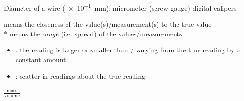 
\begin{question}%

  Diameter of a wire (\SI{e-1}{mm}): micrometer (screw gauge) \OR digital calipers~\hfill{}
\end{question}

\begin{question}%

   means the closeness of the value(s)/measurement(s) to the true value~\hfill{}\\*
   means the \textit{range} (i.e. spread) of the values/measurements~\hfill{}
\end{question}

\begin{question}%

  \begin{itemize}
    \item {}: the reading is larger or smaller than / varying from the true reading by a constant amount.~\hfill{}
    \item {}: scatter in readings about the true reading~\hfill{}
  \end{itemize}
\end{question}

\begin{question}%

  $\frac{\text{mass}}{\text{volume}}$~\hfill{}
\end{question}

